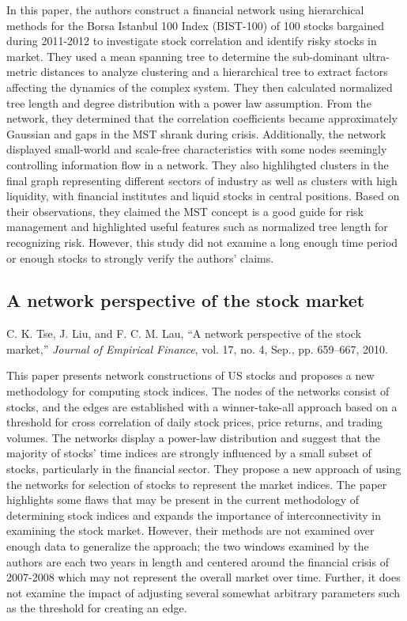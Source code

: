 \documentclass[12pt]{article}
\begin{document}
In this paper, the authors construct a financial network using hierarchical methods for the Borsa Istanbul 100 Index (BIST-100) of 100 stocks bargained during 2011-2012 to investigate stock correlation and identify risky stocks in market. They used a mean spanning tree to determine the sub-dominant ultra-metric distances to analyze clustering and a hierarchical tree to extract factors affecting the dynamics of the complex system. They then calculated normalized tree length and degree distribution with a power law assumption. From the network, they determined that the correlation coefficients became approximately Gaussian and gaps in the MST shrank during crisis. Additionally, the network displayed small-world and scale-free characteristics with some nodes seemingly controlling information flow in a network. They also highlihgted clusters in the final graph representing different sectors of industry as well as clusters with high liquidity, with financial institutes and liquid stocks in central positions. Based on their observations, they claimed the MST concept is a good guide for risk management and highlighted useful features such as normalized tree length for recognizing risk. However, this study did not examine a long enough time period or enough stocks to strongly verify the authors' claims.


\subsection{A network perspective of the stock market}
C. K. Tse, J. Liu, and F. C. M. Lau, “A network perspective of the stock market,” \textit{Journal of Empirical Finance}, vol. 17, no. 4, Sep., pp. 659–667, 2010. %
\newline

This paper presents network constructions of US stocks and proposes a new methodology for computing stock indices. The nodes of the networks consist of stocks, and the edges are established with a winner-take-all approach based on a threshold for cross correlation of daily stock prices, price returns, and trading volumes. The networks display a power-law distribution and suggest that the majority of stocks' time indices are strongly influenced by a small subset of stocks, particularly in the financial sector. They propose a new approach of using the networks for selection of stocks to represent the market indices. The paper highlights some flaws that may be present in the current methodology of determining stock indices and expands the importance of interconnectivity in examining the stock market. However, their methods are not examined over enough data to generalize the approach; the two windows examined by the authors are each two years in length and centered around the financial crisis of 2007-2008 which may not represent the overall market over time. Further, it does not examine the impact of adjusting several somewhat arbitrary parameters such as the threshold for creating an edge.
\end{document}
